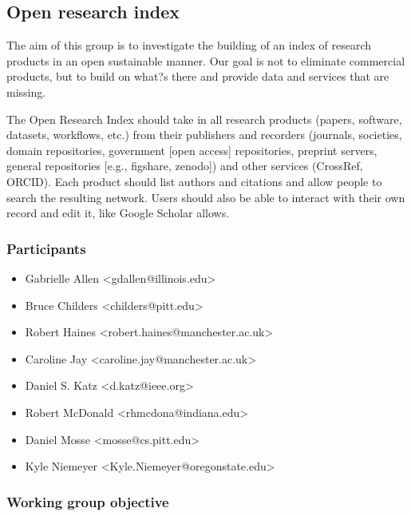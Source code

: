 \subsection{Open research index}
\label{sec:open-research-index}


The aim of this group is to investigate the building of an index of research products in an open sustainable manner.  Our goal is not to eliminate commercial products, but to build on what?s there and provide data and services that are missing.

The Open Research Index should take in all research products (papers, software, datasets, workflows, etc.) from their publishers and recorders (journals, societies, domain repositories, government [open access] repositories, preprint servers, general repositories [e.g., figshare, zenodo]) and other services (CrossRef, ORCID).
Each product should list authors and citations and allow people to search the resulting network.
Users should also be able to interact with their own record and edit it, like Google Scholar allows.

\subsubsection{Participants}

\begin{itemize}
\item Gabrielle Allen <gdallen@illinois.edu>
\item Bruce Childers <childers@pitt.edu>
\item Robert Haines <robert.haines@manchester.ac.uk>
\item Caroline Jay <caroline.jay@manchester.ac.uk>
\item Daniel S. Katz <d.katz@ieee.org>
\item Robert McDonald <rhmcdona@indiana.edu>
\item Daniel Mosse <mosse@cs.pitt.edu>
\item Kyle Niemeyer <Kyle.Niemeyer@oregonstate.edu>
\end{itemize}

\subsubsection{Working group objective}

